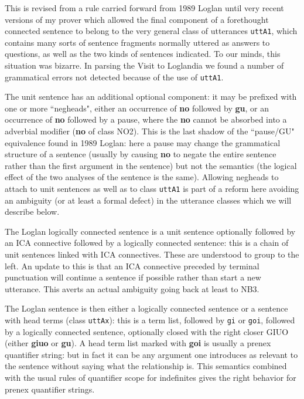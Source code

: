 \documentclass[12pt]{book}
\begin{document}
{\begin{description}
This is revised from a rule carried forward from 1989 Loglan until very recent versions of my prover which allowed the final component of a forethought connected sentence to belong to the very general class of utterances {\tt uttA1}, which contains many sorts of sentence fragments normally uttered as answers to questions, as well as the two kinds of sentences indicated.  To our minds, this situation was bizarre.  In parsing the Visit to Loglandia we found a number of grammatical errors not detected because of the use of {\tt uttA1}.

\end{description}

The unit sentence has an additional optional component:  it may be prefixed with one or more ``negheads", either an occurrence of {\bf no} followed
by {\bf gu}, or an occurrence of {\bf no} followed by a pause, where the {\bf no} cannot be absorbed into a adverbial modifier ({\bf no} of class NO2).  This is the last shadow of the ``pause/GU" equivalence found in 1989 Loglan:  here a pause may change the grammatical structure of a sentence (usually by causing {\bf no}
to negate the entire sentence rather than the first argument in the sentence) but not the semantics (the logical effect of the two analyses of the sentence is the same).  Allowing negheads to attach to unit sentences as well as to class {\tt uttA1} is part of a reform here avoiding an ambiguity (or at least a formal defect) in the utterance classes which we will describe below.

The Loglan logically connected sentence is  a unit sentence optionally followed by an ICA connective followed by a logically connected sentence:  this is a chain of unit sentences linked with ICA connectives.  These are understood to group to the left.   An update to this is that an ICA connective preceded by terminal punctuation will continue a sentence if possible rather than start a new utterance.  This averts an actual ambiguity going back at least to NB3.

The Loglan sentence is then either a logically connected sentence or a sentence with head terms (class {\tt uttAx}):  this is a term list, followed by
{\tt gi} or {\tt goi}, followed by a logically connected sentence, optionally closed with the right closer GIUO (either {\bf giuo} or {\bf gu}).   A head term list marked
with {\bf goi} is usually a prenex quantifier string:  but in fact it can be any argument one introduces as relevant to the sentence without saying what the relationship is.  This semantics combined with the usual rules of quantifier scope
for indefinites gives the right behavior for prenex quantifier strings.

}
\end{document}
